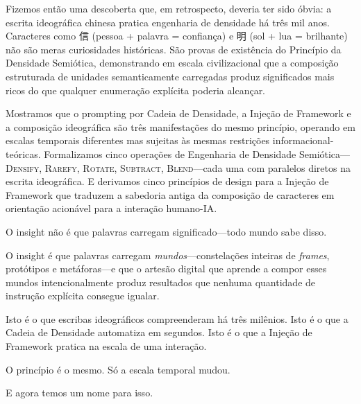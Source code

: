 \documentclass[12pt,a4paper]{article}
\newcommand{\cjk}[1]{{\cjkfont #1}}
\begin{document}
Fizemos então uma descoberta que, em retrospecto, deveria ter sido óbvia: a escrita ideográfica chinesa pratica engenharia de densidade há três mil anos.
Caracteres como \cjk{信} (pessoa + palavra = confiança) e \cjk{明} (sol + lua = brilhante) não são meras curiosidades históricas.
São provas de existência do Princípio da Densidade Semiótica, demonstrando em escala civilizacional que a composição estruturada de unidades semanticamente carregadas produz significados mais ricos do que qualquer enumeração explícita poderia alcançar.

Mostramos que o prompting por Cadeia de Densidade, a Injeção de Framework e a composição ideográfica são três manifestações do mesmo princípio, operando em escalas temporais diferentes mas sujeitas às mesmas restrições informacional-teóricas.
Formalizamos cinco operações de Engenharia de Densidade Semiótica---\textsc{Densify}, \textsc{Rarefy}, \textsc{Rotate}, \textsc{Subtract}, \textsc{Blend}---cada uma com paralelos diretos na escrita ideográfica.
E derivamos cinco princípios de design para a Injeção de Framework que traduzem a sabedoria antiga da composição de caracteres em orientação acionável para a interação humano-IA.

O insight não é que palavras carregam significado---todo mundo sabe disso.

O insight é que palavras carregam \textit{mundos}---constelações inteiras de \textit{frames}, protótipos e metáforas---e que o artesão digital que aprende a compor esses mundos intencionalmente produz resultados que nenhuma quantidade de instrução explícita consegue igualar.

Isto é o que escribas ideográficos compreenderam há três milênios.
Isto é o que a Cadeia de Densidade automatiza em segundos.
Isto é o que a Injeção de Framework pratica na escala de uma interação.

O princípio é o mesmo.
Só a escala temporal mudou.

E agora temos um nome para isso.
\end{document}
